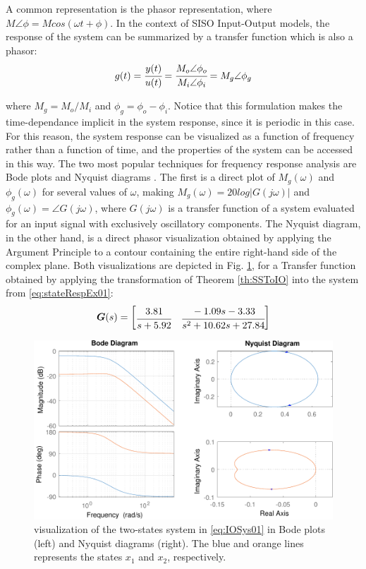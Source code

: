 \documentclass[a4paper,11pt]{book}
\numberwithin{figure}{chapter}
\numberwithin{equation}{chapter}
\numberwithin{table}{chapter}
\theoremstyle{definition}
\begin{document}
A common representation is the phasor representation, where $M \angle \phi = M cos(\omega t + \phi)$. In the context of SISO Input-Output models, the response of the system can be summarized by a transfer function which is also a phasor:
\begin{equation}
    g(t) = \cfrac{y(t)}{u(t)} = \cfrac{M_o \angle \phi_o}{M_i \angle \phi_i} = M_g \angle \phi_g
\end{equation}

\noindent where $M_g = M_o / M_i$ and $\phi_g = \phi_o - \phi_i$. Notice that this formulation makes the time-dependance implicit in the system response, since it is periodic in this case. For this reason, the system response can be visualized as a function of frequency rather than a function of time, and the properties of the system can be accessed in this way. The two most popular techniques for frequency response analysis are Bode plots \cite{Bode:1945} and Nyquist diagrams \cite{Nyquist:1932}. The first is a direct plot of $M_g(\omega)$ and $\phi_g(\omega)$ for several values of $\omega$, making $M_g(\omega) = 20 log \left| G(j\omega) \right|$ and $\phi_g(\omega) = \angle G(j\omega)$, where $G(j\omega)$ is a transfer function of a system evaluated for an input signal with exclusively oscillatory components. The Nyquist diagram, in the other hand, is a direct phasor visualization obtained by applying the Argument Principle to a contour containing the entire right-hand side of the complex plane. Both visualizations are depicted in Fig. \ref{fig:freq02}, for a Transfer function obtained by applying the transformation of Theorem \ref{th:SSToIO} into the system from \eqref{eq:stateRespEx01}:
\begin{equation} \label{eq:IOSys01}
	\bm{G}(s) = \begin{bmatrix}
		\cfrac{3.81}{s + 5.92} & \cfrac{-1.09s - 3.33}{s^2 + 10.62s + 27.84}
	\end{bmatrix}
\end{equation}

\begin{figure}[ht]
	\centering
	\includegraphics[width=\textwidth]{chapter2/freq02}
	\caption{visualization of the two-states system in \eqref{eq:IOSys01} in Bode plots (left) and Nyquist diagrams (right). The blue and orange lines represents the states $x_1$ and $x_2$, respectively.}
	\label{fig:freq02}
\end{figure}
\end{document}
